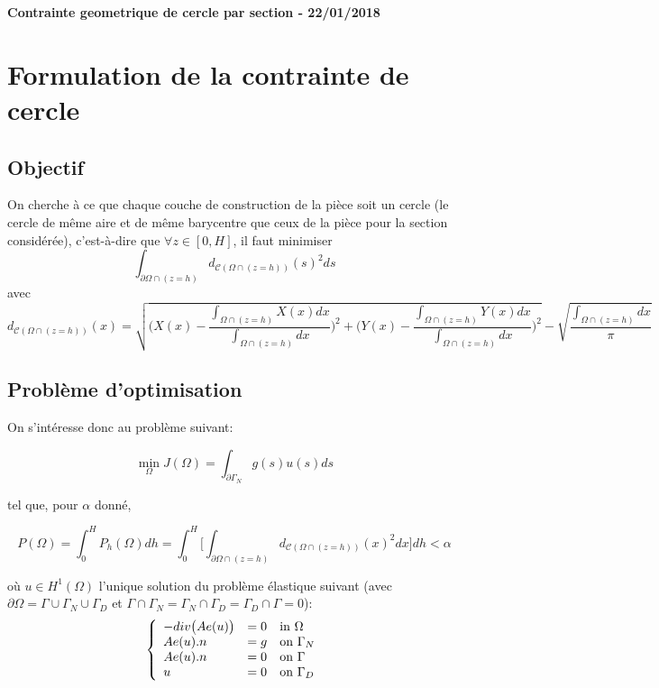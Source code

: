 \documentclass[11pt,a4paper]{article}
\begin{document}
\begin{center}
	\textbf{Contrainte geometrique de cercle par section - 22/01/2018}
\end{center}

	
\section*{Formulation de la contrainte de cercle}

\subsection*{Objectif}
On cherche à ce que chaque couche de construction de la pièce soit un cercle (le cercle de même aire  et de même barycentre que ceux de la pièce pour la section considérée), c'est-à-dire que $\forall z\in [0,H]$, il faut minimiser
\begin{equation}
\label{eq:defC1}
\int_{\partial\Omega\cap (z=h)}d_{\mathcal{C}(\Omega\cap (z=h))}(s)^2ds
\end{equation}
 avec 
 \begin{equation}
 \label{eq:explicitdist}
d_{\mathcal{C}(\Omega\cap (z=h))}(x)=\sqrt{\Bigg(X(x)-\frac{\int_{\Omega\cap (z=h)}X(x)dx}{\int_{\Omega\cap (z=h)}dx}\Bigg)^2+\Bigg(Y(x)-\frac{\int_{\Omega\cap (z=h)}Y(x)dx}{\int_{\Omega\cap (z=h)}dx}\Bigg)^2}-\sqrt{\frac{\int_{\Omega\cap (z=h)}dx}{\pi}}
 \end{equation}
 
 
 
\subsection*{Problème d'optimisation}

On s'intéresse donc au problème suivant:

\begin{equation}
\label{eq:objF}
\min_{\Omega}J(\Omega)=\int_{\partial\Gamma_N}g(s)u(s)ds 
\end{equation}

tel que, pour $\alpha$ donné,

\begin{equation}
\label{eq:constraint}
P(\Omega)=\int_{0}^{H}P_h(\Omega)dh=\int_{0}^{H}\Bigg[\int_{\partial\Omega\cap (z=h)}d_{\mathcal{C}(\Omega\cap (z=h))}(x)^2dx\Bigg]dh<\alpha
\end{equation}

où $u\in H^1(\Omega)$ l'unique solution du problème élastique suivant (avec $\partial\Omega=\Gamma\cup\Gamma_N\cup\Gamma_D$ et $\Gamma\cap\Gamma_N=\Gamma_N\cap\Gamma_D=\Gamma_D\cap\Gamma=0$):
\begin{equation}
\label{eq:pbEl}
\left\{
\begin{array}{lll}
-div\big(Ae(u)\big) & =0 & \textrm{in\,\,}\Omega \\
Ae(u).n & =g & \textrm{on\,\,}\Gamma_N \\
Ae(u).n& =0 & \textrm{on\,\,}\Gamma \\
u&=0&\textrm{on\,\,}\Gamma_D 
\end{array}
\right.
\end{equation}
\end{document}
